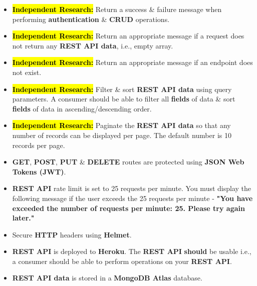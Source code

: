 \documentclass{article}
\begin{document}
\begin{itemize}
	\item \hl{\textbf{Independent Research:}} Return a success \& failure message when performing \textbf{authentication} \& \textbf{CRUD} operations.
	\item \hl{\textbf{Independent Research:}} Return an appropriate message if a request does not return any \textbf{REST API data}, i.e., empty array.
	\item \hl{\textbf{Independent Research:}} Return an appropriate message if an endpoint does not exist.
	\item \hl{\textbf{Independent Research:}} Filter \& sort \textbf{REST API data} using query parameters. A consumer should be able to filter all \textbf{fields} of data \& sort \textbf{fields} of data in ascending/descending order.
	\item \hl{\textbf{Independent Research:}} Paginate the \textbf{REST API data} so that any number of records can be displayed per page. The default number is 10 records per page. 
	\item \textbf{GET}, \textbf{POST}, \textbf{PUT} \& \textbf{DELETE} routes are protected using \textbf{JSON Web Tokens (JWT)}.
	\item \textbf{REST API} rate limit is set to 25 requests per minute. You must display the following message if the user exceeds the 25 requests per minute - \textbf{"You have exceeded the number of requests per minute: 25. Please try again later."}
	\item Secure \textbf{HTTP} headers using \textbf{Helmet}. 
	\item \textbf{REST API} is deployed to \textbf{Heroku}. The \textbf{REST API} \textbf{should} be usable i.e., a consumer should be able to perform operations on your \textbf{REST API}.
	\item \textbf{REST API data} is stored in a \textbf{MongoDB Atlas} database.
\end{itemize}
\end{document}
